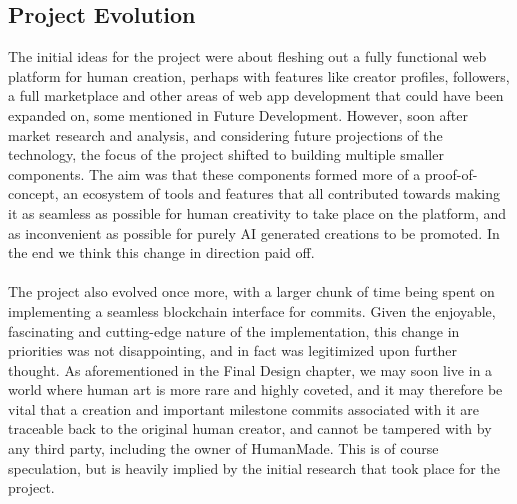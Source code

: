 \documentclass[12pt,a4paper]{article}
\begin{document}
\subsection{Project Evolution}
The initial ideas for the project were about fleshing out a fully functional web platform for human creation, perhaps with features like creator profiles, followers, a full marketplace and other areas of web app development that could have been expanded on, some mentioned in Future Development. However, soon after market research and analysis, and considering future projections of the technology, the focus of the project shifted to building multiple smaller components. The aim was that these components formed more of a proof-of-concept, an ecosystem of tools and features that all contributed towards making it as seamless as possible for human creativity to take place on the platform, and as inconvenient as possible for purely AI generated creations to be promoted. In the end we think this change in direction paid off.
\\\\
The project also evolved once more, with a larger chunk of time being spent on implementing a seamless blockchain interface for commits. Given the enjoyable, fascinating and cutting-edge nature of the implementation, this change in priorities was not disappointing, and in fact was legitimized upon further thought. As aforementioned in the Final Design chapter, we may soon live in a world where human art is more rare and highly coveted, and it may therefore be vital that a creation and important milestone commits associated with it are traceable back to the original human creator, and cannot be tampered with by any third party, including the owner of HumanMade. This is of course speculation, but is heavily implied by the initial research that took place for the project.
\end{document}
